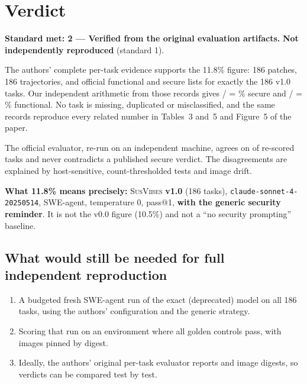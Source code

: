 \documentclass[11pt,a4paper]{article}
\newcommand{\SV}{\textsc{SusVibes}}
\begin{document}
\section{Verdict}
\begin{verdictbox}
\textbf{Standard met: 2 --- Verified from the original evaluation artifacts.} \textbf{Not independently
reproduced} (standard 1).

The authors' complete per-task evidence supports the 11.8\% figure: 186 patches, 186 trajectories, and official
functional and secure lists for exactly the 186 v1.0 tasks. Our independent arithmetic from those records gives
\SecCount/\NTasks{} = \SecPct\% secure and \FuncCount/\NTasks{} = \FuncPct\% functional. No task is missing,
duplicated or misclassified, and the same records reproduce every related number in Tables~3 and~5 and Figure~5
of the paper.

The official evaluator, re-run on an independent machine, agrees on \RvAgree{} of \RvCompared{} re-scored tasks
and never contradicts a published secure verdict. The disagreements are explained by host-sensitive,
count-thresholded tests and image drift.

\textbf{What 11.8\% means precisely:} \SV{} \textbf{v1.0} (186 tasks), \texttt{claude-sonnet-4-20250514},
SWE-agent, temperature 0, pass@1, \textbf{with the generic security reminder}. It is not the v0.0 figure (10.5\%)
and not a ``no security prompting'' baseline.
\end{verdictbox}

\subsection*{What would still be needed for full independent reproduction}
\begin{enumerate}[nosep]
  \item A budgeted fresh SWE-agent run of the exact (deprecated) model on all 186 tasks, using the authors'
  configuration and the generic strategy.
  \item Scoring that run on an environment where all golden controls pass, with images pinned by digest.
  \item Ideally, the authors' original per-task evaluator reports and image digests, so verdicts can be compared
  test by test.
\end{enumerate}

\end{document}
